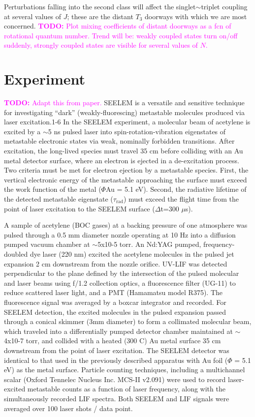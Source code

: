 \documentclass[12pt,draft]{mitthesis}
\newcommand{\TODO} [1]{\textcolor{magenta}{\textbf{TODO:} #1}}
\begin{document}
Perturbations falling into the second class will affect the
singlet$\sim$triplet coupling at several values of $J$; these are the
distant $T_3$ doorways with which we are most concerned.  \TODO{Plot
  mixing coefficients of distant doorways as a fcn of rotational
  quantum number.  Trend will be: weakly coupled states turn on/off
  suddenly, strongly coupled states are visible for several values of
  $N$.}

\section{Experiment}

\TODO{Adapt this from paper.}  SEELEM is a versatile and sensitive
technique for investigating ``dark'' (weakly-fluorescing) metastable
molecules produced via laser excitation.1-6 In the SEELEM experiment,
a molecular beam of acetylene is excited by a $\sim$5 ns pulsed laser
into spin-rotation-vibration eigenstates of metastable electronic
states via weak, nominally forbidden transitions. After excitation,
the long-lived species must travel 35 cm before colliding with an Au
metal detector surface, where an electron is ejected in a
de-excitation process. Two criteria must be met for electron ejection
by a metastable species. First, the vertical electronic energy of the
metastable approaching the surface must exceed the work function of
the metal ($\Phi$Au = 5.1 eV). Second, the radiative lifetime of the
detected metastable eigenstate ($\tau_\text{rad}$) must exceed the
flight time from the point of laser excitation to the SEELEM surface
($\Delta$t=300 $\mu$s).

A sample of acetylene (BOC gases) at a backing pressure of one
atmosphere was pulsed through a 0.5 mm diameter nozzle operating at 10
Hz into a diffusion pumped vacuum chamber at $\sim$5x10-5 torr.  An Nd:YAG
pumped, frequency-doubled dye laser (220 nm) excited the acetylene
molecules in the pulsed jet expansion 2 cm downstream from the nozzle
orifice. UV-LIF was detected perpendicular to the plane defined by the
intersection of the pulsed molecular and laser beams using f/1.2
collection optics, a fluorescence filter (UG-11) to reduce scattered
laser light, and a PMT (Hamamatsu model R375). The fluorescence signal
was averaged by a boxcar integrator and recorded. For SEELEM
detection, the excited molecules in the pulsed expansion passed
through a conical skimmer (3mm diameter) to form a collimated
molecular beam, which traveled into a differentially pumped detector
chamber maintained at $\sim$4x10-7 torr, and collided with a heated (300
C) Au metal surface 35 cm downstream from the point of laser
excitation. The SEELEM detector was identical to that used in the
previously described apparatus with Au foil ($\Phi$ = 5.1 eV) as the
metal surface.  Particle counting techniques, including a multichannel
scalar (Oxford Tennelec Nucleus Inc. MCS-II v2.091) were used to
record laser-excited metastable counts as a function of laser
frequency, along with the simultaneously recorded LIF spectra. Both
SEELEM and LIF signals were averaged over 100 laser shots / data
point.
\end{document}
